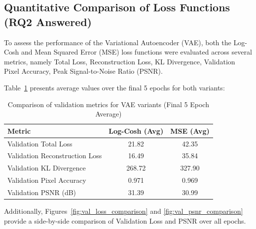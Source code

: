 \subsection{Quantitative Comparison of Loss Functions (RQ2 Answered)} \label{subsec:vae_quant_comparison}
To assess the performance of the Variational Autoencoder (VAE), both the Log-Cosh and Mean Squared Error (MSE) loss functions were evaluated across several metrics, namely Total Loss, Reconstruction Loss, KL Divergence, Validation Pixel Accuracy, Peak Signal-to-Noise Ratio (PSNR). 

Table~\ref{tab:loss_comparison} presents average values over the final 5 epochs for both variants:

\begin{table}[h]
    \centering
    \begin{tabular}{lcc}
        \toprule
        \textbf{Metric} & \textbf{Log-Cosh (Avg)} & \textbf{MSE (Avg)} \\
        \midrule
        Validation Total Loss & 21.82 & 42.35 \\
        Validation Reconstruction Loss & 16.49 & 35.84 \\
        Validation KL Divergence & 268.72 & 327.90 \\
        Validation Pixel Accuracy & 0.971 & 0.969 \\
        Validation PSNR (dB) & 31.39 & 30.99 \\
        \bottomrule
    \end{tabular}
    \caption{Comparison of validation metrics for VAE variants (Final 5 Epoch Average)}
    \label{tab:loss_comparison}
\end{table}

Additionally, Figures~\ref{fig:val_loss_comparison} and \ref{fig:val_psnr_comparison} provide a side-by-side comparison of Validation Loss and PSNR over all epochs.


